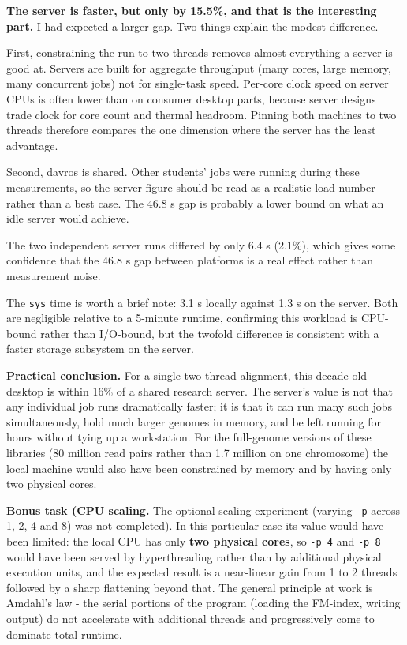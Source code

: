 \documentclass[
  11pt,
  a4paper,
]{article}
\begin{document}
\textbf{The server is faster, but only by 15.5\%, and that is the
interesting part.} I had expected a larger gap. Two things explain the
modest difference.

First, constraining the run to two threads removes almost everything a
server is good at. Servers are built for aggregate throughput (many
cores, large memory, many concurrent jobs) not for single-task speed.
Per-core clock speed on server CPUs is often lower than on consumer
desktop parts, because server designs trade clock for core count and
thermal headroom. Pinning both machines to two threads therefore
compares the one dimension where the server has the least advantage.

Second, davros is shared. Other students' jobs were running during these
measurements, so the server figure should be read as a realistic-load
number rather than a best case. The 46.8 s gap is probably a lower bound
on what an idle server would achieve.

The two independent server runs differed by only 6.4 s (2.1\%), which
gives some confidence that the 46.8 s gap between platforms is a real
effect rather than measurement noise.

The \texttt{sys} time is worth a brief note: 3.1 s locally against 1.3 s
on the server. Both are negligible relative to a 5-minute runtime,
confirming this workload is CPU-bound rather than I/O-bound, but the
twofold difference is consistent with a faster storage subsystem on the
server.

\textbf{Practical conclusion.} For a single two-thread alignment, this
decade-old desktop is within 16\% of a shared research server. The
server's value is not that any individual job runs dramatically faster;
it is that it can run many such jobs simultaneously, hold much larger
genomes in memory, and be left running for hours without tying up a
workstation. For the full-genome versions of these libraries (80 million
read pairs rather than 1.7 million on one chromosome) the local machine
would also have been constrained by memory and by having only two
physical cores.

\textbf{Bonus task (CPU scaling.} The optional scaling experiment
(varying \texttt{-p} across 1, 2, 4 and 8) was not completed). In this
particular case its value would have been limited: the local CPU has
only \textbf{two physical cores}, so \texttt{-p\ 4} and \texttt{-p\ 8}
would have been served by hyperthreading rather than by additional
physical execution units, and the expected result is a near-linear gain
from 1 to 2 threads followed by a sharp flattening beyond that. The
general principle at work is Amdahl's law - the serial portions of the
program (loading the FM-index, writing output) do not accelerate with
additional threads and progressively come to dominate total runtime.
\end{document}

